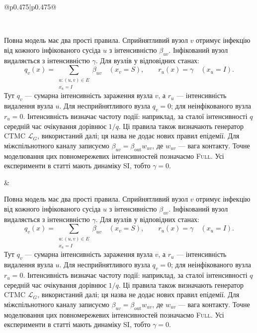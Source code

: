 ﻿\documentclass[11pt]{article}
\newcommand{\Full}{\textup{\textsc{Full}}}
\begin{document}
\begin{longtable}{@{}p{0.475\textwidth}|p{0.475\textwidth}@{}}
\begin{minipage}[t]{\linewidth}
\end{minipage} \\[5mm]
\begin{minipage}[t]{\linewidth}
Повна модель має два прості правила. Сприйнятливий вузол $v$ отримує інфекцію від кожного інфікованого сусіда $u$ з інтенсивністю $\beta_{uv}$. Інфікований вузол видаляється з інтенсивністю $\gamma$. Для вузлів у відповідних станах:
\begin{equation*}q_v(x)=\sum_{\substack{u:(u,v)\in E\\x_u=I}}\beta_{uv}
\quad (x_v=S),
\qquad r_u(x)=\gamma\quad (x_u=I).\tag{2}
\end{equation*}
Тут $q_v$ --- сумарна інтенсивність зараження вузла $v$, а $r_u$ --- інтенсивність видалення вузла $u$. Для несприйнятливого вузла $q_v=0$; для неінфікованого вузла $r_u=0$. Інтенсивність визначає частоту події: наприклад, за сталої інтенсивності $q$ середній час очікування дорівнює $1/q$. Ці правила також визначають генератор CTMC $\mathcal{L}_G$, використаний далі; ця назва не додає нових правил епідемії. Для міжспільнотного каналу записуємо $\beta_{uv}=\beta_{\mathrm{out}}w_{uv}$, де $w_{uv}$ --- вага контакту. Точне моделювання цих повномережевих інтенсивностей позначаємо \Full{}. Усі експерименти в статті мають динаміку SI, тобто $\gamma=0$.
\end{minipage} &
\begin{minipage}[t]{\linewidth}
Повна модель має два прості правила. Сприйнятливий вузол $v$ отримує інфекцію від кожного інфікованого сусіда $u$ з інтенсивністю $\beta_{uv}$. Інфікований вузол видаляється з інтенсивністю $\gamma$. Для вузлів у відповідних станах:
\begin{equation*}q_v(x)=\sum_{\substack{u:(u,v)\in E\\x_u=I}}\beta_{uv}
\quad (x_v=S),
\qquad r_u(x)=\gamma\quad (x_u=I).\tag{2}
\end{equation*}
Тут $q_v$ --- сумарна інтенсивність зараження вузла $v$, а $r_u$ --- інтенсивність видалення вузла $u$. Для несприйнятливого вузла $q_v=0$; для неінфікованого вузла $r_u=0$. Інтенсивність визначає частоту події: наприклад, за сталої інтенсивності $q$ середній час очікування дорівнює $1/q$. Ці правила також визначають генератор CTMC $\mathcal{L}_G$, використаний далі; ця назва не додає нових правил епідемії. Для міжспільнотного каналу записуємо $\beta_{uv}=\beta_{\mathrm{out}}w_{uv}$, де $w_{uv}$ --- вага контакту. Точне моделювання цих повномережевих інтенсивностей позначаємо \Full{}. Усі експерименти в статті мають динаміку SI, тобто $\gamma=0$.
\end{minipage} \\[5mm]
\begin{minipage}[t]{\linewidth}

\end{minipage}
\end{longtable}
\end{document}
